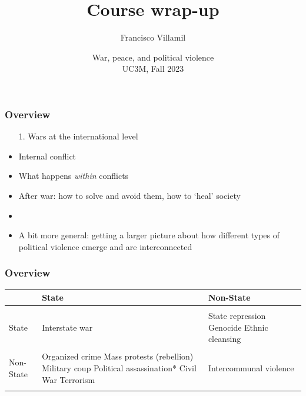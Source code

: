 \documentclass[aspectratio=43]{beamer}
\title{\huge Course wrap-up}
\author{Francisco Villamil}
\date{War, peace, and political violence\\UC3M, Fall 2023}
\begin{document}
\begin{frame}
  \titlepage
\end{frame}

\begin{frame}
\frametitle{Overview}
\centering

\begin{itemize}
  \item[1.] Wars at the international level
  \item<2->[2.] Internal conflict
  \item<3->[3.] What happens \textit{within} conflicts
  \item<4->[4.] After war: how to solve and avoid them, how to `heal' society
  \item<5->[]
  \item<5->[$\rightarrow$] A bit more general: getting a larger picture about how different types of political violence emerge and are interconnected
\end{itemize}

\end{frame}

\begin{frame}
\frametitle{Overview}
\centering

\begin{tabular}{m{1.75cm}|m{4cm}m{4cm}}
& {\color{gray}{\footnotesize Target:}} \newline State & {\color{gray}{\footnotesize Target:}} \newline Non-State \\\hline\\
{\color{gray}{\footnotesize Perpetrator:}} \newline State & Interstate war & State repression \newline Genocide \newline Ethnic cleansing \\\\
{\color{gray}{\footnotesize Perpetrator:}} \newline Non-State & Organized crime \newline Mass protests (rebellion) \newline Military coup \newline Political assassination* \newline Civil War \newline Terrorism & Intercommunal violence\\\\\hline
\end{tabular}

\end{frame}
\end{document}
